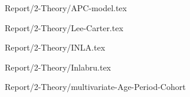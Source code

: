 {Report/2-Theory/APC-model.tex}

{Report/2-Theory/Lee-Carter.tex}

{Report/2-Theory/INLA.tex}

{Report/2-Theory/Inlabru.tex}

{Report/2-Theory/multivariate-Age-Period-Cohort}